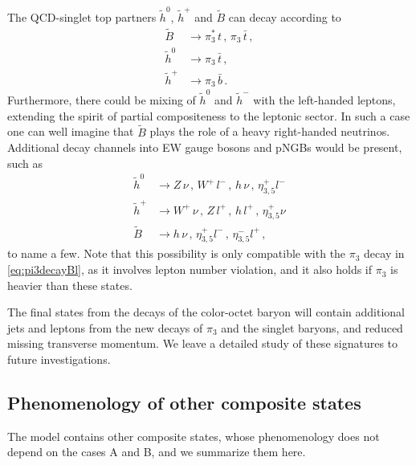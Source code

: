\documentclass[preprintnumbers,nofootinbib,showpacs,eqsecnum,pre,12pt]{revtex4-1}
\begin{document}
The QCD-singlet top partners $\tilde h^0$, $\tilde h^+$ and $\tilde B$ can decay according
to 
\begin{subequations}\begin{align}
\tilde B &\to \pi^*_3 \, t \,,\, \pi_3 \, \bar{t}\,, \\
\tilde h^0 & \to \pi_3  \, \bar{t}\,, \\
\tilde h^+ & \to \pi_3  \, \bar{b} \,.
\end{align}\end{subequations}
Furthermore, there could be mixing of $\tilde h^0$ and $\tilde h^-$ with the left-handed leptons,
extending the spirit of partial compositeness to the leptonic sector. In such a case one can well
imagine that $\tilde B$ plays the role of a heavy right-handed neutrinos. Additional decay channels into EW gauge bosons and pNGBs would be present, such as
\begin{subequations}\begin{align}
\tilde h^0 & \to Z \, \nu \,,\, W^+ \, l^- \,,\, h\, \nu \, ,\, \eta^+_{3,5} l^- \\
\tilde h^+ & \to W^+ \, \nu \,,\, Z \, l^+ \,,\, h\, l^+ \, ,\, \eta^+_{3,5} \nu \\
\tilde B & \to h\, \nu \, ,\, \eta^+_{3,5} l^- \, ,\, \eta^-_{3,5} l^+ \,,
\end{align}\end{subequations}
to name a few. Note that this possibility is only compatible with the $\pi_3$ decay in \cref{eq:pi3decayBl}, as it involves lepton number violation, and it also holds if $\pi_3$ is heavier than these states.

The final states from the decays of the color-octet baryon will contain additional jets and leptons from the new decays of $\pi_3$ and the singlet baryons, and reduced missing transverse momentum. We leave a detailed study of these signatures to future investigations.



\subsection{Phenomenology of other composite states} \label{sec:caseC}

The model contains other composite states, whose phenomenology does not depend on the cases A and B, and we summarize them here.
\end{document}
